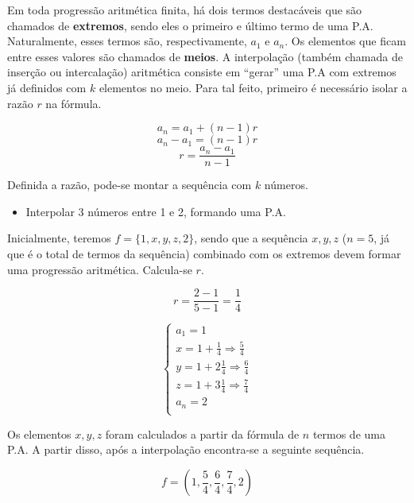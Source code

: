\documentclass[11pt]{article}
\begin{document}
Em toda progressão aritmética finita, há dois termos destacáveis que são chamados de \textbf{extremos}, sendo eles o primeiro e último termo de uma P.A. Naturalmente, esses termos são, respectivamente, $a_{1}$ e $a_{n}$. Os elementos que ficam entre esses valores são chamados de \textbf{meios}. A interpolação (também chamada de inserção ou intercalação) aritmética consiste em ``gerar'' uma P.A com extremos já definidos com $k$ elementos no meio. Para tal feito, primeiro é necessário isolar a razão $r$ na fórmula.


\begin{tcolorbox}[colback=LightGreen]
\[a_{n} = a_{1} + (n - 1)r\]
\[a_{n} - a_{1} = (n - 1)r\]
\[r = \frac{a_{n} - a_{1}}{n - 1}\]
\end{tcolorbox}

Definida a razão, pode-se montar a sequência com $k$ números.

\begin{tcolorbox}[colback=LightYellow]
\begin{itemize}
        \item Interpolar 3 números entre 1 e 2, formando uma P.A.
\end{itemize}
\end{tcolorbox}

\begin{tcolorbox}[colback=LightYellow]
Inicialmente, teremos $f = \{1, x, y, z, 2\}$, sendo que a sequência $x, y, z$ ($n = 5$, já que é o total de termos da sequência) combinado com os extremos devem formar uma progressão aritmética. Calcula-se $r$.

\[r = \frac{2 - 1}{5 - 1} = \frac{1}{4}\]

\end{tcolorbox}

\begin{tcolorbox}[colback=LightYellow]
\begin{equation*}
  \begin{cases}
    a_{1} = 1 \\
    x = 1 + \frac{1}{4} \Rightarrow \frac{5}{4} \\
    y = 1 + 2\frac{1}{4} \Rightarrow \frac{6}{4} \\
    z = 1 + 3\frac{1}{4} \Rightarrow \frac{7}{4} \\
    a_{n} = 2 \\
  \end{cases}
\end{equation*}

Os elementos $x, y, z$ foram calculados a partir da fórmula de $n$ termos de uma P.A. A partir disso, após a interpolação encontra-se a seguinte sequência.

\[f = \left(1, \frac{5}{4}, \frac{6}{4}, \frac{7}{4}, 2\right)\]
\end{tcolorbox}
\end{document}
